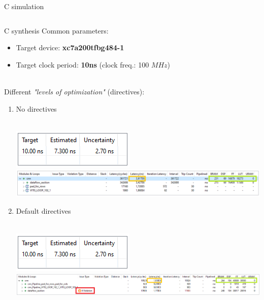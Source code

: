 \documentclass[10pt, xcolor=dvipsnames, compress]{beamer}
\begin{document}
\begin{frame}{C simulation}
\begin{spacing}{0.9}
\begin{columns}[T]
\begin{column}{.15\textwidth}
        \end{column}

    \end{columns}
    \end{spacing}
\end{frame}

\begin{frame}[allowframebreaks]{C synthesis}
    Common parameters:
    \begin{itemize}
        \item Target device: \textbf{xc7a200tfbg484-1}
        \item Target clock period: \textbf{10ns} (clock freq.: 100 $MHz$)\\~\
    \end{itemize}

    Different \textit{"levels of optimization"} (directives):

    \begin{enumerate}
        \item No directives\\~\

        \includegraphics[width=.2\textwidth]{synthesis-result/no_opt_timing.png}
        \linebreak
        \includegraphics[width=\textwidth]{synthesis-result/no_opt.png}

    \framebreak
        \item Default directives\\~\


        \includegraphics[width=.2\textwidth]{synthesis-result/opt_def_timing.png}
        \linebreak
        \includegraphics[width=\textwidth]{synthesis-result/opt_def.png}



\end{enumerate}
\end{frame}
\end{document}
